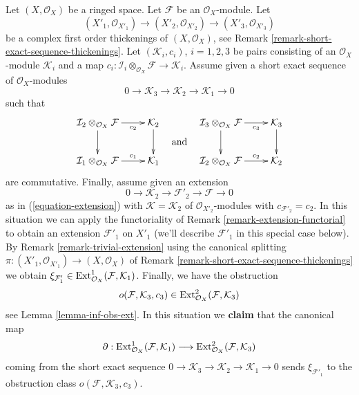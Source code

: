 \begin{remark}
\label{remark-complex-thickenings-and-ses-modules}
Let $(X, \mathcal{O}_X)$ be a ringed space. Let $\mathcal{F}$ be an
$\mathcal{O}_X$-module. Let
$$
(X'_1, \mathcal{O}_{X'_1}) \to
(X'_2, \mathcal{O}_{X'_2}) \to
(X'_3, \mathcal{O}_{X'_3})
$$
be a complex first order thickenings of $(X, \mathcal{O}_X)$, see
Remark \ref{remark-short-exact-sequence-thickenings}.
Let $(\mathcal{K}_i, c_i)$, $i = 1, 2, 3$ be pairs consisting of
an $\mathcal{O}_X$-module $\mathcal{K}_i$ and a map
$c_i : \mathcal{I}_i \otimes_{\mathcal{O}_X} \mathcal{F} \to
\mathcal{K}_i$. Assume given a short exact sequence
of $\mathcal{O}_X$-modules
$$
0 \to \mathcal{K}_3 \to \mathcal{K}_2 \to \mathcal{K}_1 \to 0
$$
such that
$$
\vcenter{
\xymatrix{
\mathcal{I}_2 \otimes_{\mathcal{O}_X} \mathcal{F}
\ar[r]_-{c_2} \ar[d] &
\mathcal{K}_2 \ar[d] \\
\mathcal{I}_1 \otimes_{\mathcal{O}_X} \mathcal{F}
\ar[r]^-{c_1} &
\mathcal{K}_1
}
}
\quad\text{and}\quad
\vcenter{
\xymatrix{
\mathcal{I}_3 \otimes_{\mathcal{O}_X} \mathcal{F}
\ar[r]_-{c_3} \ar[d] &
\mathcal{K}_3 \ar[d] \\
\mathcal{I}_2 \otimes_{\mathcal{O}_X} \mathcal{F}
\ar[r]^-{c_2} &
\mathcal{K}_2
}
}
$$
are commutative. Finally, assume given an extension
$$
0 \to \mathcal{K}_2 \to \mathcal{F}'_2 \to \mathcal{F} \to 0
$$
as in (\ref{equation-extension}) with $\mathcal{K} = \mathcal{K}_2$
of $\mathcal{O}_{X'_2}$-modules with $c_{\mathcal{F}'_2} = c_2$.
In this situation we can apply the functoriality of
Remark \ref{remark-extension-functorial} to obtain an extension
$\mathcal{F}'_1$ on $X'_1$ (we'll describe $\mathcal{F}'_1$
in this special case below). By
Remark \ref{remark-trivial-extension}
using the canonical splitting
$\pi : (X'_1, \mathcal{O}_{X'_1}) \to (X, \mathcal{O}_X)$ of
Remark \ref{remark-short-exact-sequence-thickenings}
we obtain
$\xi_{\mathcal{F}'_1} \in
\mathop{\mathrm{Ext}}\nolimits^1_{\mathcal{O}_X}(\mathcal{F}, \mathcal{K}_1)$.
Finally, we have the obstruction
$$
o(\mathcal{F}, \mathcal{K}_3, c_3) \in
\mathop{\mathrm{Ext}}\nolimits^2_{\mathcal{O}_X}(\mathcal{F}, \mathcal{K}_3)
$$
see Lemma \ref{lemma-inf-obs-ext}.
In this situation we {\bf claim} that the canonical map
$$
\partial :
\mathop{\mathrm{Ext}}\nolimits^1_{\mathcal{O}_X}(\mathcal{F}, \mathcal{K}_1)
\longrightarrow
\mathop{\mathrm{Ext}}\nolimits^2_{\mathcal{O}_X}(\mathcal{F}, \mathcal{K}_3)
$$
coming from the short exact sequence
$0 \to \mathcal{K}_3 \to \mathcal{K}_2 \to \mathcal{K}_1 \to 0$
sends $\xi_{\mathcal{F}'_1}$
to the obstruction class $o(\mathcal{F}, \mathcal{K}_3, c_3)$.


\end{remark}
